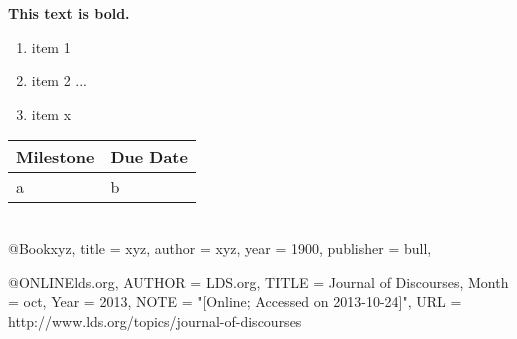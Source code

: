 \clearpage
\def \date {April 14, 2013}

\textbf{This text is bold.}

\begin {enumerate}
	\item item 1
	\item item 2
	...
	\item item x
\end {enumerate}

\begin {tabular} {l | l}
	Milestone & Due Date \\ \hline
	a & b\\
\end {tabular}\\



@Book{xyz,
	title = {xyz},
	author = {xyz},
	year = {1900},
	publisher = {bull},
}

@ONLINE{lds.org,
	AUTHOR = {LDS.org},
	TITLE = {Journal of Discourses},
	Month = oct,
	Year = {2013},
	NOTE = "[Online; Accessed on 2013-10-24]",
	URL = {http://www.lds.org/topics/journal-of-discourses}
}

